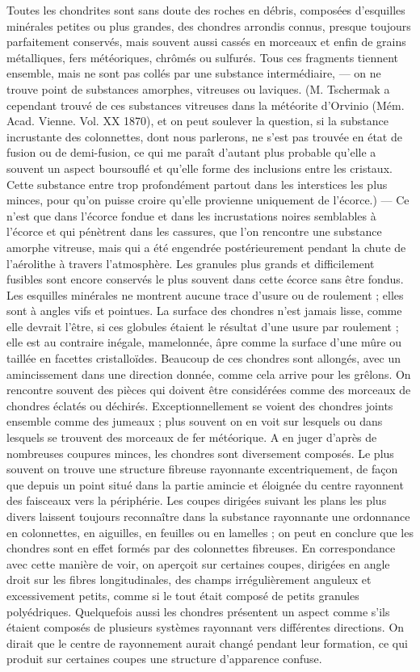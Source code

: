 \documentclass[a4paper, 12pt, oneside, french]{book}
\begin{document}
\og Toutes les chondrites sont sans doute des roches en débris, composées d'esquilles minérales petites ou plus grandes, des chondres arrondis connus, presque toujours parfaitement conservés, mais souvent aussi cassés en morceaux et enfin de grains métalliques, fers météoriques, chrômés ou sulfurés. Tous ces fragments tiennent ensemble, mais ne sont pas collés par une substance intermédiaire, --- on ne trouve point de substances amorphes, vitreuses ou laviques. \fg (M. Tschermak a cependant trouvé de ces substances vitreuses dans la météorite d'Orvinio (Mém. Acad. Vienne. Vol. XX 1870), et on peut soulever la question, si la substance incrustante des colonnettes, dont nous parlerons, ne s'est pas trouvée en état de fusion ou de demi-fusion, ce qui me paraît d'autant plus probable qu'elle a souvent un aspect boursouflé et qu'elle forme des inclusions entre les cristaux. Cette substance entre trop profondément partout dans les interstices les plus minces, pour qu'on puisse croire qu'elle provienne uniquement de l'écorce.) --- \og Ce n'est que dans l'écorce fondue et dans les incrustations noires semblables à l'écorce et qui pénètrent dans les cassures, que l'on rencontre une substance amorphe vitreuse, mais qui a été engendrée postérieurement pendant la chute de l'aérolithe à travers l'atmosphère. Les granules plus grands et difficilement fusibles sont encore conservés le plus souvent dans cette écorce sans être fondus. Les esquilles minérales ne montrent aucune trace d'usure ou de roulement ; elles sont à angles vifs et pointues. La surface des chondres n'est jamais lisse, comme elle devrait l'être, si ces globules étaient le résultat d'une usure par roulement ; elle est au contraire inégale, mamelonnée, âpre comme la surface d'une mûre ou taillée en facettes cristalloïdes. Beaucoup de ces chondres sont allongés, avec un amincissement dans une direction donnée, comme cela arrive pour les grêlons. On rencontre souvent des pièces qui doivent être considérées comme des morceaux de chondres éclatés ou déchirés. Exceptionnellement se voient des chondres joints ensemble comme des jumeaux ; plus souvent on en voit sur lesquels ou dans lesquels se trouvent des morceaux de fer météorique. A en juger d'après de nombreuses coupures minces, les chondres sont diversement composés. Le plus souvent on trouve une structure fibreuse rayonnante excentriquement, de façon que depuis un point situé dans la partie amincie et éloignée du centre rayonnent des faisceaux vers la périphérie. Les coupes dirigées suivant les plans les plus divers laissent toujours reconnaître dans la substance rayonnante une ordonnance en colonnettes, en aiguilles, en feuilles ou en lamelles ; on peut en conclure que les chondres sont en effet formés par des colonnettes fibreuses. En correspondance avec cette manière de voir, on aperçoit sur certaines coupes, dirigées en angle droit sur les fibres longitudinales, des champs irrégulièrement anguleux et excessivement petits, comme si le tout était composé de petits granules polyédriques. Quelquefois aussi les chondres présentent un aspect comme s'ils étaient composés de plusieurs systèmes rayonnant vers différentes directions. On dirait que le centre de rayonnement aurait changé pendant leur formation, ce qui produit sur certaines coupes une structure d'apparence confuse. 
\end{document}
